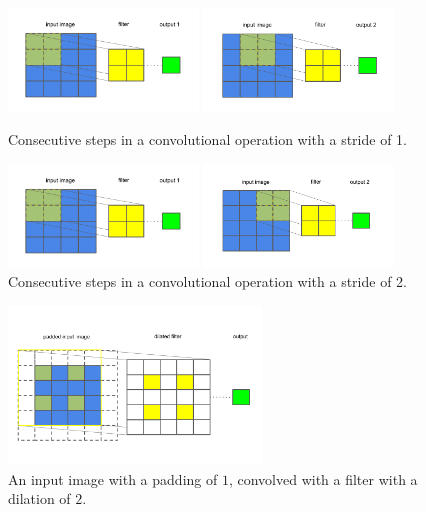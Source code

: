 \begin{figure}[H]
	\parbox{.5\linewidth}{
   		\centering
    		\includegraphics[width=0.45\textwidth, height=0.2\textwidth]{convolution1}
		}
	\hfill
	\parbox{.5\linewidth}{
   		\centering
    		\includegraphics[width=0.45\textwidth, height=0.2\textwidth]{convolution2}
		}
	\caption{Consecutive steps in a convolutional operation with a stride of 1.}
	
	\parbox{.5\linewidth}{
   		\centering
    		\includegraphics[width=0.45\textwidth, height=0.2\textwidth]{convolution1}
		}
	\hfill
	\parbox{.5\linewidth}{
   		\centering
    		\includegraphics[width=0.45\textwidth, height=0.2\textwidth]{stride_of_2}
		}
	\caption{Consecutive steps in a convolutional operation with a stride of 2.}
\end{figure}

\begin{figure}[H]
   	\centering
    	\includegraphics[width=0.6\textwidth, height=0.3\textwidth]{padding_and_dilation}
	\caption{An input image with a padding of $ 1 $, convolved with a filter with a dilation of $ 2 $.}
\end{figure}

